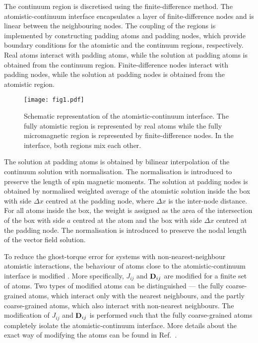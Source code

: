 \documentclass[11pt,fleqn,a4]{book} %
\begin{document}
The continuum region is discretised using the finite-difference method. The atomistic-continuum interface encapsulates a layer of finite-difference nodes and is linear between the neighbouring nodes. The coupling of the regions is implemented by constructing padding atoms and padding nodes, which provide boundary conditions for the atomistic and the continuum regions, respectively. Real atoms interact with padding atoms, while the solution at padding atoms is obtained from the continuum region. Finite-difference nodes interact with padding nodes, while the solution at padding nodes is obtained from the atomistic region. 

\begin{figure}
  \begin{center}
    \texttt{[image: fig1.pdf]}
  \end{center}
  \caption{Schematic representation of the atomistic-continuum interface. The fully atomistic region is represented by real atoms while the fully micromagnetic region is represented by finite-difference nodes. In the interface, both regions mix each other.}
  \label{fig:scheme}
\end{figure}

The solution at padding atoms is obtained by bilinear interpolation of the continuum solution with normalisation. The normalisation is introduced to preserve the length of spin magnetic moments.
The solution at padding nodes is obtained by normalised weighted average of the atomistic solution inside the box with side $\Delta x$ centred at the padding node, where $\Delta x$ is the inter-node distance. For all atoms inside the box, the weight is assigned as the area of the intersection of the box with side $a$ centred at the atom and the box with side $\Delta x$ centred at the padding node. The normalisation is introduced to preserve the nodal length of the vector field solution.

To reduce the ghost-torque error for systems with non-nearest-neighbour atomistic interactions, the behaviour of atoms close to the atomistic-continuum interface is modified \cite{paper2}. More specifically, $J_{ij}$ and ${\bf D}_{ij}$ are modified for a finite set of atoms. Two types of modified atoms can be distinguished --- the fully coarse-grained atoms, which interact only with the nearest neighbours, and the partly coarse-grained atoms, which also interact with non-nearest neighbours. The modification of $J_{ij}$ and ${\bf D}_{ij}$ is performed such that the fully coarse-grained atoms completely isolate the atomistic-continuum interface. More details about the exact way of modifying the atoms can be found in Ref.~\cite{paper2}. 
\end{document}
